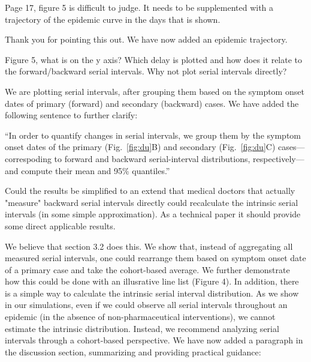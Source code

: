 \documentclass[12pt]{article}
\newcommand{\fref}[1]{Fig.~\ref{fig:#1}}
\newcommand{\revtext}{\textsf}
\begin{document}
\revtext{Page 17, figure 5 is difficult to judge. It needs to be supplemented with a trajectory of the epidemic curve in the days that is shown.}

Thank you for pointing this out. We have now added an epidemic trajectory.

\revtext{Figure 5, what is on the y axis? Which delay is plotted and how does it relate to the forward/backward serial intervals. Why not plot serial intervals directly?}

We are plotting serial intervals, after grouping them based on the symptom onset dates of primary (forward) and secondary (backward) cases. We have added the following sentence to further clarify:

``In order to quantify changes in serial intervals, we group them by the symptom onset dates of the primary (\fref{du}B) and secondary (\fref{du}C) cases---correspoding to forward and backward serial-interval distributions, respectively---and compute their mean and 95\% quantiles.''

\revtext{Could the results be simplified to an extend that medical doctors that actually "measure" backward serial intervals directly could recalculate the intrinsic serial intervals (in some simple approximation). As a technical paper it should provide some direct applicable results.}

We believe that section 3.2 does this. We show that, instead of aggregating all measured serial intervals, one could rearrange them based on symptom onset date of a primary case and take the cohort-based average. We further demonstrate how this could be done with an illusrative line list (Figure 4). In addition, there is a simple way to calculate the intrinsic serial interval distribution. As we show in our simulations, even if we could observe all serial intervals throughout an epidemic (in the absence of non-pharmaceutical interventions), we cannot estimate the intrinsic distribution. Instead, we recommend analyzing serial intervals through a cohort-based perspective. We have now added a paragraph in the discussion section, summarizing and providing practical guidance:
\end{document}
